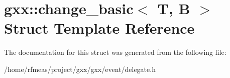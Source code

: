 \hypertarget{structgxx_1_1change__basic}{}\section{gxx\+:\+:change\+\_\+basic$<$ T, B $>$ Struct Template Reference}
\label{structgxx_1_1change__basic}


The documentation for this struct was generated from the following file\+:\begin{DoxyCompactItemize}
\item 
/home/rfmeas/project/gxx/gxx/event/delegate.\+h\end{DoxyCompactItemize}
